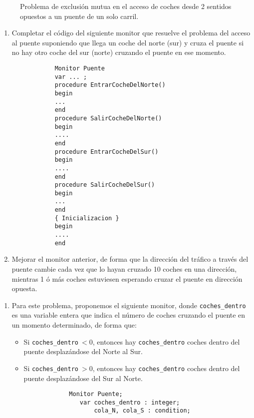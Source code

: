 \begin{ejercicio}
\begin{figure}
        \caption{\centering  Problema de exclusión mutua en el acceso de coches desde 2 sentidos opuestos a un puente de un solo carril.}
        \label{fig:ej2.6}
    \end{figure}
    \begin{enumerate}
        \item Completar el código del siguiente monitor que resuelve el problema del acceso al puente suponiendo que llega un coche del norte (sur) y cruza el puente si no hay otro coche del sur (norte) cruzando el puente en ese momento.
        \begin{verbatim}
            Monitor Puente
            var ... ;
            procedure EntrarCocheDelNorte()
            begin
            ...
            end
            procedure SalirCocheDelNorte()
            begin
            ....
            end
            procedure EntrarCocheDelSur()
            begin
            ....
            end
            procedure SalirCocheDelSur()
            begin
            ...
            end
            { Inicializacion }
            begin
            ....
            end
        \end{verbatim}

        \item Mejorar el monitor anterior, de forma que la dirección del tráfico a través del puente cambie cada vez que lo hayan cruzado 10 coches en una dirección, mientras 1 ó más coches estuviesen esperando cruzar el puente en dirección opuesta.
    \end{enumerate}    

    \begin{enumerate}
        \item Para este problema, proponemos el siguiente monitor, donde \verb|coches_dentro| es una variable entera que indica el número de coches cruzando el puente en un momento determinado, de forma que:
            \begin{itemize}
                \item Si \verb|coches_dentro|$\ <0$, entonces hay \verb|coches_dentro| coches dentro del puente desplazándose del Norte al Sur.
                \item Si \verb|coches_dentro|$\ >0$, entonces hay \verb|coches_dentro| coches dentro del puente desplazándose del Sur al Norte.
            \end{itemize}
            \begin{verbatim}
                Monitor Puente;
                   var coches_dentro : integer;
                       cola_N, cola_S : condition;


\end{verbatim}
\end{enumerate}
\end{ejercicio}
